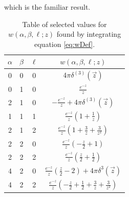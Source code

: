 \documentclass[%
 preprint,
 amsmath,amssymb,
 aps,
]{revtex4-1}
\begin{document}
which is the familiar result.
\begin{table}
\begin{center}
\begin{tabular}{| c c c | c |}
\hline
$\alpha$ & $\beta$ & $\ell$ & $ w(\alpha,\beta,\ell; z)$ \\
\hline
0 & 0 & 0 & $ 4\pi \delta^{(3)}(\vec{z}) $ \\
0 & 1 & 0 & $ \frac{\displaystyle e^{-z}}{\displaystyle z} $ \\
2 & 1 & 0 & $ -\frac{\displaystyle e^{-z}}{\displaystyle z} + 4\pi \delta^{(3)}(\vec{z}) $ \\
1 & 1 & 1 &  $\frac{\displaystyle e^{-z}}{\displaystyle z} (1 + \tfrac{1}{z})  $ \\
2 & 1 & 2 & $ \frac{\displaystyle e^{-z}}{\displaystyle z} (1+ \tfrac{3}{z} + \tfrac{3}{z^2} )$ \\
2 & 2 & 0 & $ \frac{\displaystyle e^{-z}}{\displaystyle z} (-\tfrac{z}{2} + 1 ) $ \\
2 & 2 & 2 & $  \frac{\displaystyle e^{-z}}{\displaystyle z} (\tfrac{z}{2} + \tfrac{1}{2} ) $ \\
4 & 2 & 0 & $  \frac{\displaystyle e^{-z}}{\displaystyle z} (\tfrac{z}{2} - 2 ) + 4 \pi \delta^3( \vec{z} )  $ \\
4 & 2 & 2 & $  \frac{\displaystyle e^{-z}}{\displaystyle z} ( - \tfrac{z}{2} + \tfrac{1}{2} + \tfrac{3}{z} + \tfrac{3}{z^2} ) $ \\
\hline
\end{tabular}
\end{center}
\caption{\label{table:wTable} Table of selected values for $w(\alpha,\beta,\ell; z)$ found by integrating equation \eqref{eq:wDef}.}
\end{table}



\end{document}
